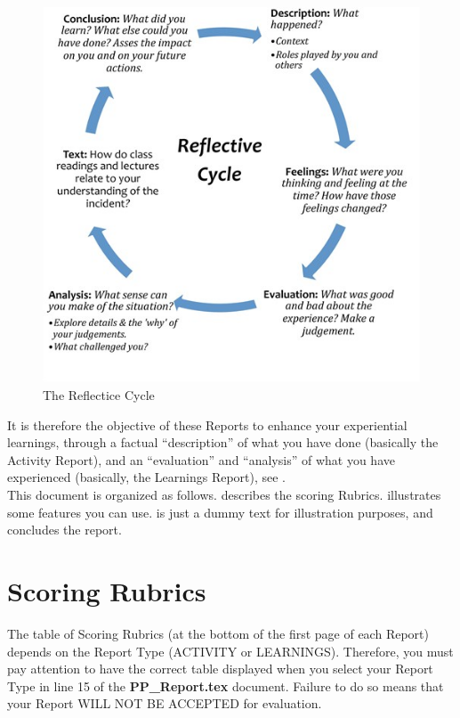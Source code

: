 \documentclass[a4paper,12pt,journal,twoside,compsoc]{PPIEEEtran}
\begin{document}
\begin{figure}[htb]
\centering
\includegraphics[width=1\linewidth]{reflective-cycle.jpg}
\caption{The Reflectice Cycle}
\label{fig_ref_cycle}
\end{figure}

It is therefore the objective of these Reports to enhance your experiential learnings, through a factual ``description'' of what you have done (basically the Activity Report), and an ``evaluation'' and ``analysis'' of what you have experienced (basically, the Learnings Report), see .\\

This document is organized as follows.  describes the scoring Rubrics.  illustrates some features you can use.  is just a dummy text for illustration purposes, and  concludes the report.

\section{Scoring Rubrics}
\label{rubrics}
The table of Scoring Rubrics (at the bottom of the first page of each Report) depends on the Report Type (ACTIVITY or LEARNINGS). Therefore, you must pay attention to have the correct table displayed when you select your Report Type in line 15 of the \textbf{PP\_Report.tex} document. Failure to do so means that your Report WILL NOT BE ACCEPTED for evaluation.
\end{document}
